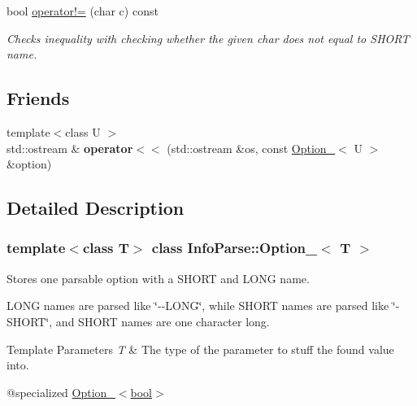 \begin{DoxyCompactItemize}
\begin{DoxyCompactList}
    \end{DoxyCompactList}\item
    \mbox{\label{class_info_parse_1_1_option___ac45e423563ae11a609bbb1d0af804e40}}
    bool \mbox{\hyperlink{class_info_parse_1_1_option___ac45e423563ae11a609bbb1d0af804e40}{operator!=}} (char c) const
    \begin{DoxyCompactList}
        \small\item\em Checks inequality with checking whether the given char does not equal to S\+H\+O\+RT name.
    \end{DoxyCompactList}
\end{DoxyCompactItemize}
\subsection*{Friends}
\begin{DoxyCompactItemize}
    \item
    \mbox{\label{class_info_parse_1_1_option___a90698d256c45cf77c5bcf9120e4d8c5e}}
    {\footnotesize template$<$class U $>$ }\\std\+::ostream \& {\bfseries operator$<$$<$} (std\+::ostream \&os, const \mbox{\hyperlink{class_info_parse_1_1_option__}{Option\+\_\+}}$<$ U $>$ \&option)
\end{DoxyCompactItemize}


\subsection{Detailed Description}
\subsubsection*{template$<$class T$>$\newline
class Info\+Parse\+::\+Option\+\_\+$<$ T $>$}

Stores one parsable option with a S\+H\+O\+RT and L\+O\+NG name.

L\+O\+NG names are parsed like \char`\"{}-\/-\/\+L\+O\+N\+G\char`\"{}, while S\+H\+O\+RT names are parsed like \char`\"{}-\/\+S\+H\+O\+R\+T\char`\"{}, and S\+H\+O\+RT names are one character long.


\begin{DoxyTemplParams}{Template Parameters}
{\em T}
    & The type of the parameter to stuff the found value into.\\
    \hline
\end{DoxyTemplParams}
@specialized \mbox{\hyperlink{class_info_parse_1_1_option___3_01bool_01_4}{Option\+\_\+$<$bool$>$}}

